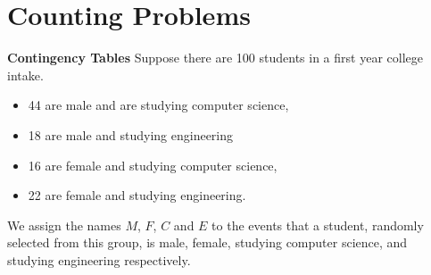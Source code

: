 \documentclass[]{report}
\begin{document}
\chapter{Counting Problems}

{
	\noindent \textbf{Contingency Tables}
	Suppose there are 100 students in a first year college intake.  \begin{itemize} \item 44 are male and are studying computer science, \item 18 are male and studying engineering \item 16 are female and studying computer science, \item 22 are female and studying engineering. \end{itemize}
	
	We assign the names $M$, $F$, $C$ and $E$ to the events that a student, randomly selected from this group, is male, female, studying computer science, and studying engineering respectively.
}
\end{document}
